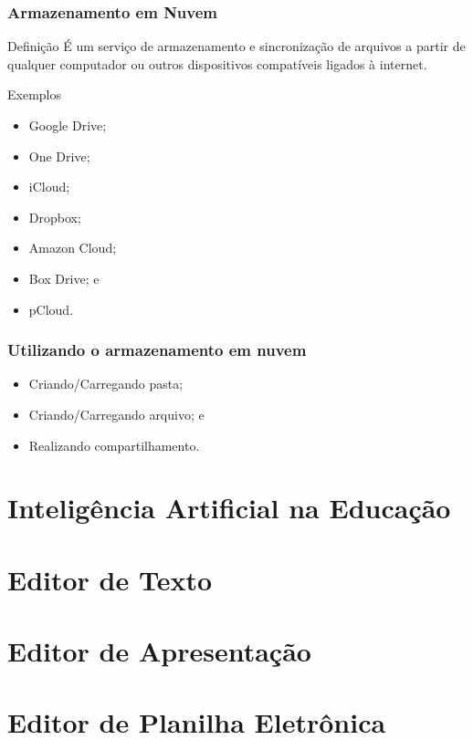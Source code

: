 \documentclass[aspectratio=169]{beamer} %
\begin{document}
\begin{frame}
	\frametitle{Armazenamento em Nuvem}
	
	\begin{block}{Defini\c cão}
		É um serviço de armazenamento e sincronização de arquivos a partir de qualquer computador ou outros dispositivos compatíveis ligados à internet.
	\end{block} \vfill
	
	\begin{exampleblock}{Exemplos}
		\begin{itemize}
			\item Google Drive;
			\item One Drive;
			\item iCloud; 
			\item Dropbox;
			\item Amazon Cloud;
			\item Box Drive; e
			\item pCloud.
		\end{itemize}
	\end{exampleblock}
\end{frame}

\begin{frame}
	\frametitle{Utilizando o armazenamento em nuvem}
	
	\begin{itemize}
		\item Criando/Carregando pasta;
		\item Criando/Carregando arquivo; e
		\item Realizando compartilhamento.
	\end{itemize}
\end{frame}

\section{Inteligência Artificial na Educação}

\section{Editor de Texto}

\section{Editor de Apresentação}

\section{Editor de Planilha Eletrônica}
\end{document}
